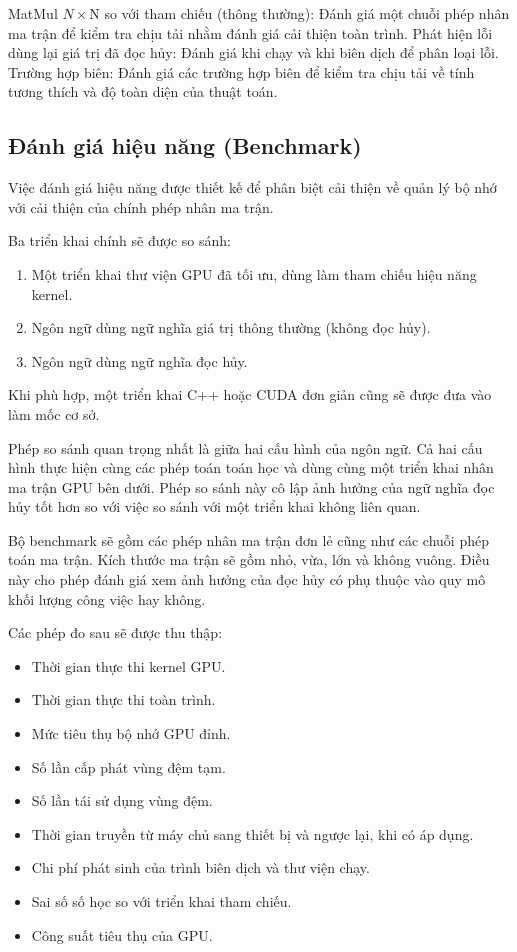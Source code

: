 \documentclass[a4paper]{article}
\begin{document}
	MatMul $N \times $N so với tham chiếu (thông thường): Đánh giá một chuỗi phép nhân ma trận để kiểm tra chịu tải nhằm đánh giá cải thiện toàn trình.
	Phát hiện lỗi dùng lại giá trị đã đọc hủy: Đánh giá khi chạy và khi biên dịch để phân loại lỗi.
	Trường hợp biên: Đánh giá các trường hợp biên để kiểm tra chịu tải về tính tương thích và độ toàn diện của thuật toán.
	
	
	\subsection{Đánh giá hiệu năng (Benchmark)}
	
	Việc đánh giá hiệu năng được thiết kế để phân biệt cải thiện về quản lý bộ nhớ với cải thiện của chính phép nhân ma trận.
	
	Ba triển khai chính sẽ được so sánh:
	
	\begin{enumerate}
		\item Một triển khai thư viện GPU đã tối ưu, dùng làm tham chiếu hiệu năng kernel.
		\item Ngôn ngữ dùng ngữ nghĩa giá trị thông thường (không đọc hủy).
		\item Ngôn ngữ dùng ngữ nghĩa đọc hủy.
	\end{enumerate}
	
	Khi phù hợp, một triển khai C++ hoặc CUDA đơn giản cũng sẽ được đưa vào làm mốc cơ sở.
	
	Phép so sánh quan trọng nhất là giữa hai cấu hình của ngôn ngữ. Cả hai cấu hình thực hiện cùng các phép toán toán học và dùng cùng một triển khai nhân ma trận GPU bên dưới. Phép so sánh này cô lập ảnh hưởng của ngữ nghĩa đọc hủy tốt hơn so với việc so sánh với một triển khai không liên quan.
	
	Bộ benchmark sẽ gồm các phép nhân ma trận đơn lẻ cũng như các chuỗi phép toán ma trận. Kích thước ma trận sẽ gồm nhỏ, vừa, lớn và không vuông. Điều này cho phép đánh giá xem ảnh hưởng của đọc hủy có phụ thuộc vào quy mô khối lượng công việc hay không.
	
	Các phép đo sau sẽ được thu thập:
	
	\begin{itemize}
		\item Thời gian thực thi kernel GPU.
		\item Thời gian thực thi toàn trình.
		\item Mức tiêu thụ bộ nhớ GPU đỉnh.
		\item Số lần cấp phát vùng đệm tạm.
		\item Số lần tái sử dụng vùng đệm.
		\item Thời gian truyền từ máy chủ sang thiết bị và ngược lại, khi có áp dụng.
		\item Chi phí phát sinh của trình biên dịch và thư viện chạy.
		\item Sai số số học so với triển khai tham chiếu.
		\item Công suất tiêu thụ của GPU.
	\end{itemize}
	
\end{document}
